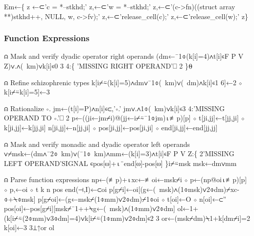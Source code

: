\documentclass{article}%
\begin{document}
\nwenddocs{}\plusendmoddef\nwstartdeflinemarkup{}\nwenddeflinemarkup
Em←\{
        z ←⊂'c = *--stkhd;'
        z,←⊂'w = *--stkhd;'
        z,←⊂'(c->fn)((struct array **)stkhd++, NULL, w, c->fv);'
        z,←⊂'release_cell(c);'
        z,←⊂'release_cell(w);'
z\}
\nwendcode{}\nwdocspar

\subsubsection{Function Expressions}

\nwenddocs{}\endmoddef\nwstartdeflinemarkup{}\nwenddeflinemarkup
⍝ Mask and verify dyadic operator right operands
(dm←¯1⌽(k[i]=4)∧t[i]∊F P V Z)∨.∧(~km)∨k[i]∊0 3 4:\{
        'MISSING RIGHT OPERAND'⎕ 2
\}⍬

⍝ Refine schizophrenic types
k[i⌿⍨(k[i]=5)∧dm∨¯1⌽(~km)∨(~dm)∧k[i]∊1 6]←2 ⋄ k[i⌿⍨k[i]=5]←3

⍝ Rationalize ∘.
jm←(t[i]=P)∧n[i]∊⊂,'∘.'
jm∨.∧1⌽(~km)∨k[i]∊3 4:'MISSING OPERAND TO ∘.'⎕ 2
p←((ji←jm⌿i)@(jj←i⌿⍨¯1⌽jm)⍳≢p)[p] ⋄ t[ji,jj]←t[jj,ji] ⋄ k[ji,jj]←k[jj,ji]
n[ji,jj]←n[jj,ji] ⋄ pos[ji,jj]←pos[ji,ji] ⋄ end[ji,jj]←end[jj,jj]

⍝ Mask and verify monadic and dyadic operator left operands
∨⌿msk←(dm∧¯2⌽~km)∨(¯1⌽~km)∧mm←(k[i]=3)∧t[i]∊F P V Z:\{
        2'MISSING LEFT OPERAND'SIGNAL ∊pos[⍵]+⍳¨end[⍵]-pos[⍵]
\}i⌿⍨msk
msk←dm∨mm

⍝ Parse function expressions
np←(≢p)+⍳xc←≢oi←msk⌿i ⋄ p←(np@oi⍳≢p)[p] ⋄ p,←oi ⋄ t k n pos end(⊣,I)←⊂oi
p[g⌿i]←oi[(g←(~msk)∧(1⌽msk)∨2⌽dm)⌿xc-⌽+⍀⌽msk]
p[g⌿oi]←(g←msk⌿(1⌽mm)∨2⌽dm)⌿1⌽oi ⋄ t[oi]←O ⋄ n[oi]←⊂''
pos[oi]←pos[g⌿i][msk⌿¯1++⍀g←(~msk)∧(1⌽mm)∨2⌽dm]
ol←1+(k[i⌿⍨(2⌽mm)∨3⌽dm]=4)∨k[i⌿⍨(1⌽mm)∨2⌽dm]∊2 3
or←(msk⌿dm)⍀1+k[dm⌿i]=2
k[oi]←3 3⊥↑or ol
\nwendcode{}\nwdocspar
\end{document}
